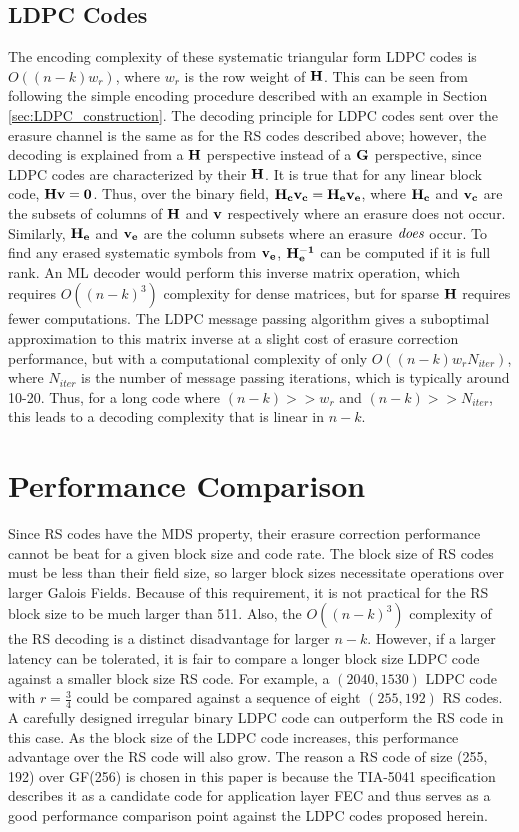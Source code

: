 \documentclass[conference]{IEEEtran}
\begin{document}
\subsection{LDPC Codes}

The encoding complexity of these systematic triangular form LDPC codes is $O((n-k)w_r)$, where $w_r$ is the row weight of $\bf{H}$.  This can be seen from following the simple encoding procedure described with an example in Section \ref{sec:LDPC_construction}.  The decoding principle for LDPC codes sent over the erasure channel is the same as for the RS codes described above; however, the decoding is explained from a $\bf{H}$ perspective instead of a $\bf{G}$ perspective, since LDPC codes are characterized by their $\bf{H}$.  It is true that for any linear block code, $\bf{H}\bf{v} = \bf{0}$.  Thus, over the binary field, $\bf{H}_c\bf{v}_c = \bf{H}_e\bf{v}_e$, where $\bf{H}_c$ and $\bf{v}_c$ are the subsets of columns of $\bf{H}$ and $\bf{v}$ respectively where an erasure does not occur.  Similarly, $\bf{H}_e$ and $\bf{v}_e$ are the column subsets where an erasure $\it{does}$ occur.  To find any erased systematic symbols from $\bf{v}_e$, $\bf{H}_e^{-1}$ can be computed if it is full rank.  An ML decoder would perform this inverse matrix operation, which requires $O((n-k)^3)$ complexity for dense matrices, but for sparse $\bf{H}$ requires fewer computations.  The LDPC message passing algorithm gives a suboptimal approximation to this matrix inverse at a slight cost of erasure correction performance, but with a computational complexity of only $O((n-k)w_rN_{iter})$, where $N_{iter}$ is the number of message passing iterations, which is typically around 10-20.  Thus, for a long code where $(n-k) >> w_r$ and $(n-k) >> N_{iter}$, this leads to a decoding complexity that is linear in $n-k$.

\section{Performance Comparison}\label{sec:Performance}
Since RS codes have the MDS property, their erasure correction performance cannot be beat for a given block size and code rate.  The block size of RS codes must be less than their field size, so larger block sizes necessitate operations over larger Galois Fields.  Because of this requirement, it is not practical for the RS block size to be much larger than 511.  Also, the $O((n-k)^3)$ complexity of the RS decoding is a distinct disadvantage for larger $n-k$.  However, if a larger latency can be tolerated, it is fair to compare a longer block size LDPC code against a smaller block size RS code.  For example, a $(2040, 1530)$ LDPC code with $r = \frac{3}{4}$ could be compared against a sequence of eight $(255, 192)$ RS codes.  A carefully designed irregular binary LDPC code can outperform the RS code in this case.  As the block size of the LDPC code increases, this performance advantage over the RS code will also grow.  The reason a RS code of size (255, 192) over GF(256) is chosen in this paper is because the TIA-5041 specification \cite{TIA5041_standard} describes it as a candidate code for application layer FEC and thus serves as a good performance comparison point against the LDPC codes proposed herein.
\end{document}
